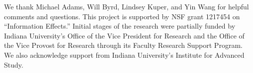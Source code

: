 \documentclass[preprint]{sigplanconf}
\begin{document}

\acks We thank Michael Adams, Will Byrd, Lindsey Kuper, and Yin Wang for
helpful comments and questions. This project is supported by NSF grant
1217454 on ``Information Effects.'' Initial stages of the research were
partially funded by Indiana University's Office of the Vice President for
Research and the Office of the Vice Provost for Research through its Faculty
Research Support Program.  We also acknowledge support from Indiana
University's Institute for Advanced Study.

\begin{small}


\end{small}
\end{document}
